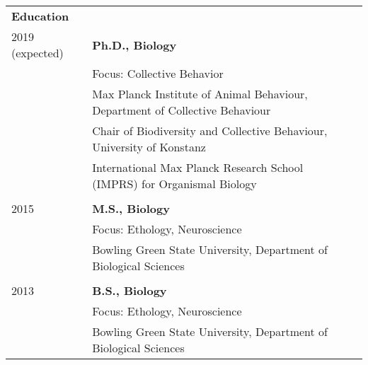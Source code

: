 \documentclass[letterpaper,10pt,oneside]{article}
\begin{document}
\noindent \begin{longtable}{@{} l p{5.3in}l}



\Large{\textbf{Education}} \vspace{5mm} \\
 \large{2019 (expected)} 
 & \textbf{Ph.D., Biology} \\
 & Focus: Collective Behavior \\
 & {Max Planck Institute of Animal Behaviour, Department of Collective Behaviour} \\
  & {Chair of Biodiversity and Collective Behaviour, University of Konstanz} \\
 	& {International Max Planck Research School (IMPRS) for Organismal Biology} \\
     
     & \\
 \large{2015} 
  & \textbf{M.S., Biology} \\
 & Focus: Ethology, Neuroscience \\
     & {Bowling Green State University, Department of Biological Sciences} \\
    
     & \\
 \large{2013} 
  &\textbf{B.S., Biology} \\
 & Focus: Ethology, Neuroscience \\
      & {Bowling Green State University, Department of Biological Sciences} \\
    

\end{longtable}
\end{document}
